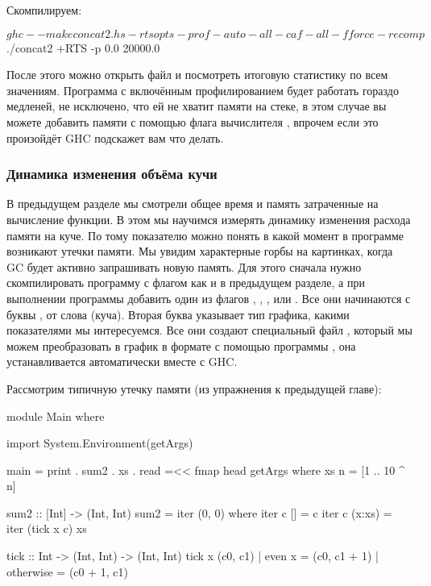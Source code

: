 Скомпилируем:

\begin{code}
$ ghc --make concat2.hs -rtsopts -prof -auto-all -caf-all -fforce-recomp
$ ./concat2 +RTS -p
0.0
20000.0
\end{code}
  
После этого можно открыть файл  и посмотреть 
итоговую статистику по всем значениям. Программа с включённым
профилированием будет работать гораздо медленей, не исключено,
что ей не хватит памяти на стеке, в этом случае вы можете добавить
памяти с помощью флага вычислителя , впрочем если это произойдёт
GHC подскажет вам что делать. 

\subsubsection{Динамика изменения объёма кучи}

В предыдущем разделе мы смотрели общее время и память
затраченные на вычисление функции. В этом мы научимся
измерять динамику изменения расхода памяти на куче. 
По тому показателю можно понять в какой момент 
в программе возникают утечки памяти. Мы увидим характерные
горбы на картинках, когда GC будет активно запрашивать новую память.
Для этого сначала нужно скомпилировать программу с флагом 
как и в предыдущем разделе, а при выполнении программы 
добавить один из флагов , , ,  или .
Все они начинаются с буквы , от слова  (куча). 
Вторая буква указывает тип графика, какими показателями
мы интересуемся. Все они создают специальный файл 
, который мы можем преобразовать в
график в формате  с помощью программы
, она устанавливается автоматически вместе с GHC.

Рассмотрим типичную утечку памяти (из упражнения к предыдущей главе):


\begin{code}
module Main where

import System.Environment(getArgs)

main = print . sum2 . xs . read =<< fmap head getArgs  
    where xs n = [1 .. 10 ^ n]

sum2 :: [Int] -> (Int, Int)
sum2 = iter (0, 0)
    where iter c  []     = c
          iter c  (x:xs) = iter (tick x c) xs

tick :: Int -> (Int, Int) -> (Int, Int)
tick x (c0, c1) | even x    = (c0, c1 + 1)
                | otherwise = (c0 + 1, c1)
\end{code}

